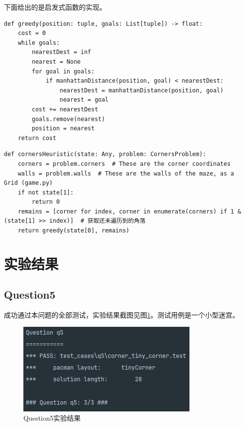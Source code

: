 下面给出的是启发式函数的实现。
\begin{lstlisting}[emph={[3]parent,pathCost,problem,heuristic,state,goals,position},emphstyle={[3]\color{vscode_parametercolor}},emph={[4]SearchProblem,Callable,Node,Reached,Any},emphstyle={[4]\color{vscode_classcolor}}]
def greedy(position: tuple, goals: List[tuple]) -> float:
    cost = 0
    while goals:
        nearestDest = inf
        nearest = None
        for goal in goals:
            if manhattanDistance(position, goal) < nearestDest:
                nearestDest = manhattanDistance(position, goal)
                nearest = goal
        cost += nearestDest
        goals.remove(nearest)
        position = nearest
    return cost
\end{lstlisting}
\begin{lstlisting}[emph={[3]parent,pathCost,problem,heuristic,state,goals,position},emphstyle={[3]\color{vscode_parametercolor}},emph={[4]SearchProblem,Callable,Node,Reached,Any},emphstyle={[4]\color{vscode_classcolor}}]
def cornersHeuristic(state: Any, problem: CornersProblem):
    corners = problem.corners  # These are the corner coordinates
    walls = problem.walls  # These are the walls of the maze, as a Grid (game.py)
    if not state[1]:
        return 0
    remains = [corner for index, corner in enumerate(corners) if 1 & (state[1] >> index)]  # 获取还未遍历到的角落
    return greedy(state[0], remains)
\end{lstlisting}
\section{实验结果}
\subsection{Question5}
成功通过本问题的全部测试，实验结果截图见图\ref{q5}。测试用例是一个小型迷宫。
\begin{figure}[htbp]
    \centering
    \includegraphics[scale = 0.7]{pic/q5.png}
    \caption{Question5实验结果}\label{q5}
\end{figure}
